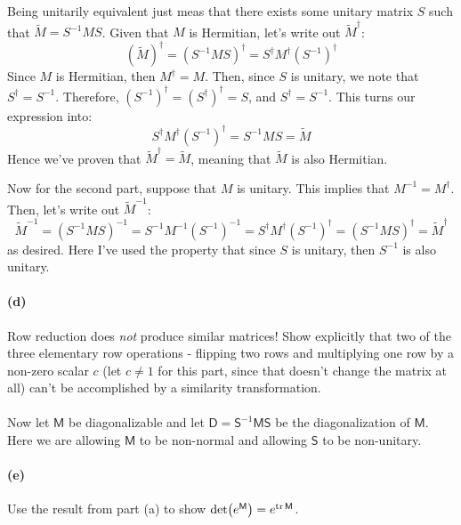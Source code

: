 \documentclass{article}
\begin{document}
\begin{solution}
	Being unitarily equivalent just meas that there exists some unitary matrix $S$ such that $\tilde M = 
	S^{-1}MS$. Given that $M$ is Hermitian, let's write out $\tilde M^\dagger$:
	\[
		(\tilde M)^\dagger = (S^{-1}MS)^\dagger = S^\dagger M^\dagger (S^{-1})^\dagger
	\] 
	Since $M$ is Hermitian, then $M^\dagger = M$. Then, since $S$ is unitary, we note that $S^\dagger = S^{-1}$.
	Therefore, $(S^{-1})^\dagger = (S^\dagger)^\dagger = S$, and $S^\dagger = S^{-1}$. This turns 
	our expression into:
	\[
		S^{\dagger} M^\dagger (S^{-1})^\dagger = S^{-1} M S = \tilde M
	\] 
	Hence we've proven that $\tilde M^\dagger = \tilde M$, meaning that $\tilde M$ is also Hermitian. 

	Now for the second part, suppose that $M$ is unitary. This implies that $M^{-1} = M^\dagger$. Then, let's 
	write out $\tilde M^{-1}$:
	\[
		\tilde M^{-1} = (S^{-1}MS)^{-1} = S^{-1}M^{-1} (S^{-1})^{-1} = S^\dagger M^\dagger (S^{-1})^\dagger = 
		(S^{-1}MS)^\dagger = \tilde M^\dagger 
	\] 
	as desired. Here I've used the property that since $S$ is unitary, then $S^{-1}$ is also unitary. 
\end{solution}
\paragraph{(d)}		\extrapart
Row reduction does \emph{not} produce similar matrices!  Show explicitly that two of the three elementary row operations - flipping two rows and multiplying
one row by a non-zero scalar $c$ (let $c\neq 1$ for this part, since that doesn't change the matrix at all) can't be accomplished by a similarity transformation.


\phline
\paragraph{}
Now let $\mathsf{M}$ be diagonalizable and let $\mathsf{D} = \mathsf{S}^{-1}\mathsf{MS}$ be the diagonalization of $\mathsf{M}$.  
Here we are allowing $\mathsf{M}$ to be non-normal and allowing $\mathsf{S}$ to be non-unitary.

\paragraph{(e)}
Use the result from part (a) to show $\det(e^{\mathsf{M}}) = e^{\operatorname{tr} \mathsf{M}}$.
\end{document}
